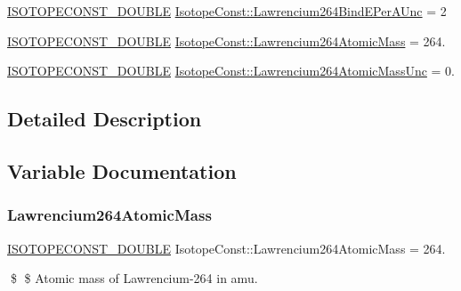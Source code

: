 \begin{DoxyCompactItemize}
\mbox{\hyperlink{group___isotope_const-_macros_ga8f45a7272ce02c0b4c65c44636ed719a}{I\+S\+O\+T\+O\+P\+E\+C\+O\+N\+S\+T\+\_\+\+D\+O\+U\+B\+LE}} \mbox{\hyperlink{group___isotope_const-_lawrencium-_lr264_ga79ce0ac17b880e82c2754aba0af1d52e}{Isotope\+Const\+::\+Lawrencium264\+Bind\+E\+Per\+A\+Unc}} = 2
\item 
\mbox{\hyperlink{group___isotope_const-_macros_ga8f45a7272ce02c0b4c65c44636ed719a}{I\+S\+O\+T\+O\+P\+E\+C\+O\+N\+S\+T\+\_\+\+D\+O\+U\+B\+LE}} \mbox{\hyperlink{group___isotope_const-_lawrencium-_lr264_ga1e7d136619a4ba1109ad7c4bd35106e9}{Isotope\+Const\+::\+Lawrencium264\+Atomic\+Mass}} = 264.
\item 
\mbox{\hyperlink{group___isotope_const-_macros_ga8f45a7272ce02c0b4c65c44636ed719a}{I\+S\+O\+T\+O\+P\+E\+C\+O\+N\+S\+T\+\_\+\+D\+O\+U\+B\+LE}} \mbox{\hyperlink{group___isotope_const-_lawrencium-_lr264_gadaf1deef977d8700ec14e61854d7e639}{Isotope\+Const\+::\+Lawrencium264\+Atomic\+Mass\+Unc}} = 0.
\end{DoxyCompactItemize}


\subsection{Detailed Description}


\subsection{Variable Documentation}
\mbox{\label{group___isotope_const-_lawrencium-_lr264_ga1e7d136619a4ba1109ad7c4bd35106e9}} 
\subsubsection{\texorpdfstring{Lawrencium264\+Atomic\+Mass}{Lawrencium264AtomicMass}}
{\footnotesize\ttfamily \mbox{\hyperlink{group___isotope_const-_macros_ga8f45a7272ce02c0b4c65c44636ed719a}{I\+S\+O\+T\+O\+P\+E\+C\+O\+N\+S\+T\+\_\+\+D\+O\+U\+B\+LE}} Isotope\+Const\+::\+Lawrencium264\+Atomic\+Mass = 264.}

\$ \$ Atomic mass of Lawrencium-\/264 in amu. \mbox{\label{group___isotope_const-_lawrencium-_lr264_gadaf1deef977d8700ec14e61854d7e639}} 
